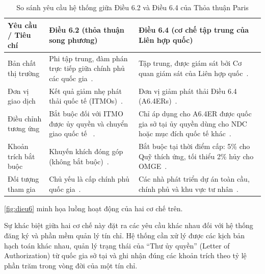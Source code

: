 \begin{table}[htbp]
    \centering
    \caption{So sánh yêu cầu hệ thống giữa Điều 6.2 và Điều 6.4 của Thỏa thuận Paris}
    \label{tab:dieu6}
    \small
    \renewcommand{\arraystretch}{1.25}
    \begin{tabularx}{\textwidth}{|p{3.2cm}|X|X|}
        \hline
        \textbf{Yêu cầu / Tiêu chí} & \textbf{Điều 6.2 (thỏa thuận song phương)} & \textbf{Điều 6.4 (cơ chế tập trung của Liên hợp quốc)} \\
        \hline
        Bản chất thị trường & Phi tập trung, đàm phán trực tiếp giữa chính phủ các quốc gia~\cite{columbia2025article6}. & Tập trung, được giám sát bởi Cơ quan giám sát của Liên hợp quốc~\cite{columbia2025article6}. \\
        \hline
        Đơn vị giao dịch & Kết quả giảm nhẹ phát thải quốc tế (ITMOs)~\cite{columbia2025article6}. & Đơn vị giảm phát thải Điều 6.4 (A6.4ERs)\index{A6.4ERs}~\cite{columbia2025article6}. \\
        \hline
        Điều chỉnh tương ứng & Bắt buộc đối với ITMO được ủy quyền và chuyển giao quốc tế~\cite{columbia2025article6} \cite{unfccc2022cma3}. & Chỉ áp dụng cho A6.4ER được quốc gia sở tại ủy quyền dùng cho NDC hoặc mục đích quốc tế khác~\cite{unfccc2022cma3}. \\
        \hline
        Khoản trích bắt buộc & Khuyến khích đóng góp (không bắt buộc)~\cite{unfccc2022cma3}. & Bắt buộc tại thời điểm cấp: 5\% cho Quỹ thích ứng, tối thiểu 2\% hủy cho OMGE~\cite{unfccc2022cma3}. \\
        \hline
        Đối tượng tham gia & Chủ yếu là cấp chính phủ quốc gia~\cite{columbia2025article6}. & Các nhà phát triển dự án toàn cầu, chính phủ và khu vực tư nhân~\cite{columbia2025article6}. \\
        \hline
    \end{tabularx}
\end{table}

\HinhDieuSau

\autoref{fig:dieu6} minh họa luồng hoạt động của hai cơ chế trên.

Sự khác biệt giữa hai cơ chế này đặt ra các yêu cầu khác nhau đối với hệ thống đăng ký và phần mềm quản lý tín chỉ. Hệ thống cần xử lý được các kịch bản hạch toán khác nhau, quản lý trạng thái của ``Thư ủy quyền'' (Letter of Authorization) từ quốc gia sở tại và ghi nhận đúng các khoản trích theo tỷ lệ phần trăm trong vòng đời của một tín chỉ.

